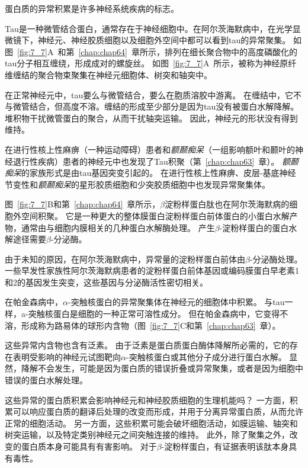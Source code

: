 \begin{proposition}[神经解剖学导航术语] \label{box:7_1}
	
	\quad \quad 蛋白质的异常积累是许多神经系统疾病的标志。
	
	\quad \quad Tau是一种微管结合蛋白，通常存在于神经细胞中。在阿尔茨海默病中，在光学显微镜下，神经元、神经胶质细胞以及细胞外空间中都可以看到tau的异常聚集。
	如图~\ref{fig:7_7}A~和第~\ref{chap:chap64}~章所示，排列在细长聚合物中的高度磷酸化的tau分子相互缠绕，形成成对的螺旋丝。
	如图~\ref{fig:7_7}A~所示，被称为神经原纤维缠结的聚合物束聚集在神经元细胞体、树突和轴突中。
	
	\quad \quad 在正常神经元中，tau要么与微管结合，要么在胞质溶胶中游离。
	在缠结中，它不与微管结合，但高度不溶。缠结的形成至少部分是因为tau没有被蛋白水解降解。
	堆积物干扰微管蛋白的聚合，从而干扰轴突运输。
	因此，神经元的形状没有得到维持。
	
	\quad \quad 在进行性核上性麻痹（一种运动障碍）患者和\textit{额颞痴呆}（一组影响额叶和颞叶的神经退行性疾病）患者的神经元中也发现了Tau积聚（第~\ref{chap:chap63}~章）。
	\textit{额颞痴呆}的家族形式是由tau基因突变引起的。
	在进行性核上性麻痹、皮层-基底神经节变性和\textit{额颞痴呆}的星形胶质细胞和少突胶质细胞中也发现异常聚集体。
	
	\quad \quad 图~\ref{fig:7_7}B和第~\ref{chap:chap64}~章所示，$\beta$淀粉样蛋白肽也在阿尔茨海默病的细胞外空间积聚。
	它是一种更大的整体膜蛋白淀粉样蛋白前体蛋白的小蛋白水解产物，通常由与细胞内膜相关的几种蛋白水解酶处理。
	产生$\beta$-淀粉样蛋白的蛋白水解途径需要$\beta$-分泌酶。
	
	\quad \quad 由于未知的原因，在阿尔茨海默病中，异常量的淀粉样蛋白前体由$\beta$-分泌酶处理。
	一些早发性家族性阿尔茨海默病患者的淀粉样蛋白前体基因或编码膜蛋白早老素1和2的基因发生突变，这些基因与分泌酶活性密切相关。
	
	\quad \quad 在帕金森病中，$\alpha$-突触核蛋白的异常聚集体在神经元的细胞体中积累。
	与tau一样，a-突触核蛋白是细胞的一种正常可溶性成分。
	但在帕金森病中，它变得不溶，形成称为路易体的球形内含物（图~\ref{fig:7_7}C和第~\ref{chap:chap63}~章）。
	
	\quad \quad 这些异常内含物也含有泛素。
	由于泛素是蛋白质蛋白酶体降解所必需的，它的存在表明受影响的神经元试图靶向$\alpha$-突触核蛋白或其他分子成分进行蛋白水解。
	显然，降解不会发生，可能是因为蛋白质的错误折叠或异常聚集，或者是因为细胞中错误的蛋白水解处理。
	
	\quad \quad 这些异常的蛋白质积累会影响神经元和神经胶质细胞的生理机能吗？
	一方面，积累可以响应蛋白质的翻译后处理的改变而形成，并用于分离异常蛋白质，从而允许正常的细胞活动。
	另一方面，这些积累可能会破坏细胞活动，如膜运输、轴突和树突运输，以及特定类别神经元之间突触连接的维持。
	此外，除了聚集之外，改变的蛋白质本身可能具有有害影响。
	对于$\beta$-淀粉样蛋白，有证据表明该肽本身具有毒性。
	
\end{proposition}


